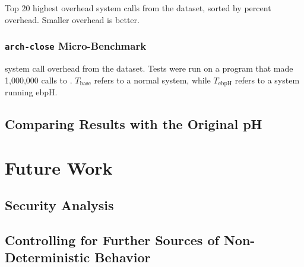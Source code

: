 \documentclass[
  12pt]{findlay}
\begin{document}
\begin{table}
    \caption{Top 20 highest overhead system calls from the  dataset, sorted by percent overhead. Smaller
    overhead is better.}
\end{table}

\hypertarget{arch-close-micro-benchmark}{%
\subsubsection{\texorpdfstring{\texttt{arch-close}
Micro-Benchmark}{arch-close Micro-Benchmark}}\label{arch-close-micro-benchmark}}

\begin{center}

\end{center}

\begin{table}
    \caption[ system call overhead from the  dataset]{
    system call overhead from the  dataset. Tests were run on a program
    that made 1,000,000 calls to . $T_\text{base}$ refers to a normal system, while $T_\text{ebpH}$
    refers to a system running ebpH.}
    
\end{table}

\hypertarget{comparing-results-with-the-original-ph}{%
\subsection{Comparing Results with the Original
pH}\label{comparing-results-with-the-original-ph}}

\hypertarget{future-work}{%
\section{Future Work}\label{future-work}}

\hypertarget{security-analysis}{%
\subsection{Security Analysis}\label{security-analysis}}

\hypertarget{controlling-for-further-sources-of-non-deterministic-behavior}{%
\subsection{Controlling for Further Sources of Non-Deterministic
Behavior}\label{controlling-for-further-sources-of-non-deterministic-behavior}}
\end{document}
